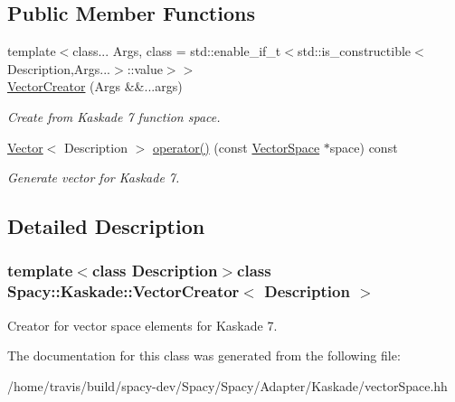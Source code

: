\subsection*{Public Member Functions}
\begin{DoxyCompactItemize}
\item 
{\footnotesize template$<$class... Args, class  = std\-::enable\-\_\-if\-\_\-t$<$std\-::is\-\_\-constructible$<$\-Description,\-Args...$>$\-::value$>$$>$ }\\\hyperlink{group__VectorSpaceGroup_ga89de372343310640870077e6167df3f4}{Vector\-Creator} (Args \&\&...args)
\begin{DoxyCompactList}\small\item\em Create from Kaskade 7 function space. \end{DoxyCompactList}\item 
\hypertarget{classSpacy_1_1Kaskade_1_1VectorCreator_aaceaab9c73fe2738c9f32eae99953f97}{\hyperlink{classSpacy_1_1Kaskade_1_1Vector}{Vector}$<$ Description $>$ \hyperlink{classSpacy_1_1Kaskade_1_1VectorCreator_aaceaab9c73fe2738c9f32eae99953f97}{operator()} (const \hyperlink{classSpacy_1_1VectorSpace}{Vector\-Space} $\ast$space) const }\label{classSpacy_1_1Kaskade_1_1VectorCreator_aaceaab9c73fe2738c9f32eae99953f97}

\begin{DoxyCompactList}\small\item\em Generate vector for Kaskade 7. \end{DoxyCompactList}\end{DoxyCompactItemize}


\subsection{Detailed Description}
\subsubsection*{template$<$class Description$>$class Spacy\-::\-Kaskade\-::\-Vector\-Creator$<$ Description $>$}

Creator for vector space elements for Kaskade 7. 

The documentation for this class was generated from the following file\-:\begin{DoxyCompactItemize}
\item 
/home/travis/build/spacy-\/dev/\-Spacy/\-Spacy/\-Adapter/\-Kaskade/vector\-Space.\-hh\end{DoxyCompactItemize}
